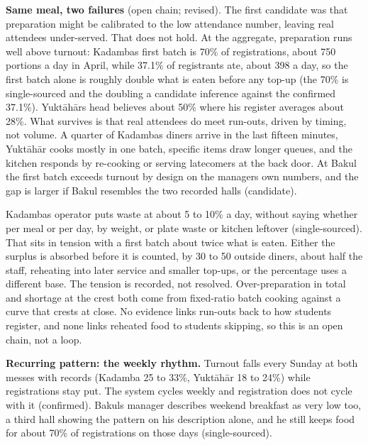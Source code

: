 \documentclass[
  10pt,
  table]{article}
\newcounter{none} %
\begin{document}
\textbf{Same meal, two failures} (open chain; revised). The first candidate was that preparation might be calibrated to the low attendance number, leaving real attendees under-served. That does not hold. At the aggregate, preparation runs well above turnout: Kadamba\textquotesingle s first batch is 70\% of registrations, about 750 portions a day in April, while 37.1\% of registrants ate, about 398 a day, so the first batch alone is roughly double what is eaten before any top-up (the 70\% is single-sourced and the doubling a candidate inference against the confirmed 37.1\%). Yuktāhār\textquotesingle s head believes about 50\% where his register averages about 28\%. What survives is that real attendees do meet run-outs, driven by timing, not volume. A quarter of Kadamba\textquotesingle s diners arrive in the last fifteen minutes, Yuktāhār cooks mostly in one batch, specific items draw longer queues, and the kitchen responds by re-cooking or serving latecomers at the back door. At Bakul the first batch exceeds turnout by design on the manager\textquotesingle s own numbers, and the gap is larger if Bakul resembles the two recorded halls (candidate).

Kadamba\textquotesingle s operator puts waste at about 5 to 10\% a day, without saying whether per meal or per day, by weight, or plate waste or kitchen leftover (single-sourced). That sits in tension with a first batch about twice what is eaten. Either the surplus is absorbed before it is counted, by 30 to 50 outside diners, about half the staff, reheating into later service and smaller top-ups, or the percentage uses a different base. The tension is recorded, not resolved. Over-preparation in total and shortage at the crest both come from fixed-ratio batch cooking against a curve that crests at close. No evidence links run-outs back to how students register, and none links reheated food to students skipping, so this is an open chain, not a loop.

\textbf{Recurring pattern: the weekly rhythm.} Turnout falls every Sunday at both messes with records (Kadamba 25 to 33\%, Yuktāhār 18 to 24\%) while registrations stay put. The system cycles weekly and registration does not cycle with it (confirmed). Bakul\textquotesingle s manager describes weekend breakfast as very low too, a third hall showing the pattern on his description alone, and he still keeps food for about 70\% of registrations on those days (single-sourced).
\end{document}
